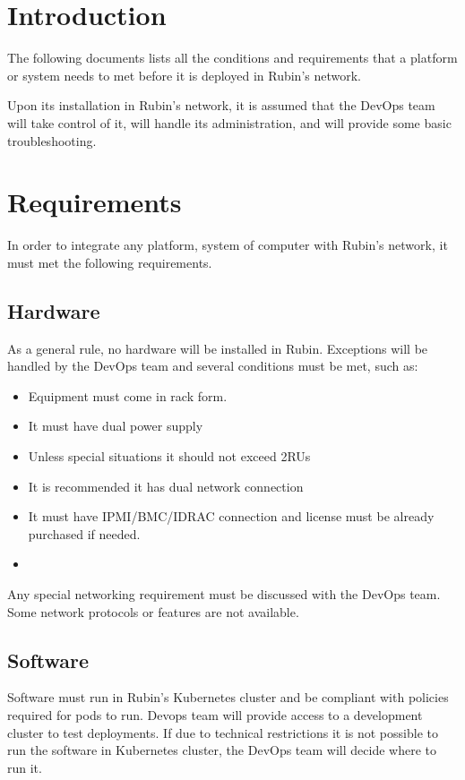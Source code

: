 \section{Introduction}

The following documents lists all the conditions and requirements that a platform or system needs to met before it is deployed in Rubin's network. 

Upon its installation in Rubin's network, it is assumed that the DevOps team will take control of it, will handle its administration, and will provide some basic troubleshooting. 

\section{Requirements}

In order to integrate any platform, system of computer with Rubin's network, it must met the following requirements. 

\subsection{Hardware}

As a general rule, no hardware will be installed in Rubin. Exceptions will be handled by the DevOps team and several conditions must be met, such as:

\begin{itemize}
    \item Equipment must come in rack form. 
    \item It must have dual power supply
    \item Unless special situations it should not exceed 2RUs
    \item It is recommended it has dual network connection
    \item It must have IPMI/BMC/IDRAC connection and license must be already purchased if needed.
    \item 
\end{itemize}

Any special networking requirement must be discussed with the DevOps team. Some network protocols or features are not available.

\subsection{Software}

Software must run in Rubin’s  Kubernetes cluster and be compliant with policies required for pods to run. Devops team will provide access to a development cluster to test deployments. If due to technical restrictions it is not possible to run the software in Kubernetes cluster, the DevOps team will decide where to run it. 

